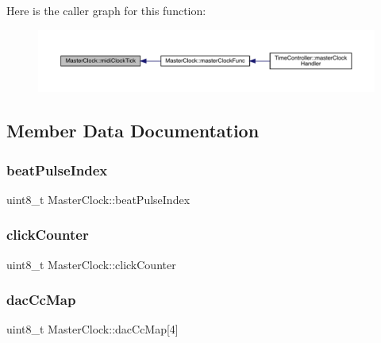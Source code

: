 Here is the caller graph for this function\+:
\nopagebreak
\begin{figure}[H]
\begin{center}
\leavevmode
\includegraphics[width=350pt]{class_master_clock_a9c19932a580f5c5797fd31a58dc1a410_icgraph}
\end{center}
\end{figure}


\subsection{Member Data Documentation}
\mbox{\label{class_master_clock_a0ad4b4c84d2c4edb8922b4ee35a82463}} 
\subsubsection{\texorpdfstring{beat\+Pulse\+Index}{beatPulseIndex}}
{\footnotesize\ttfamily uint8\+\_\+t Master\+Clock\+::beat\+Pulse\+Index}

\mbox{\label{class_master_clock_a38515df1824a4cadd6d8a277b5792dc3}} 
\subsubsection{\texorpdfstring{click\+Counter}{clickCounter}}
{\footnotesize\ttfamily uint8\+\_\+t Master\+Clock\+::click\+Counter}

\mbox{\label{class_master_clock_a8b3d56a964ecdfc61f7368184713dea0}} 
\subsubsection{\texorpdfstring{dac\+Cc\+Map}{dacCcMap}}
{\footnotesize\ttfamily uint8\+\_\+t Master\+Clock\+::dac\+Cc\+Map\mbox{[}4\mbox{]}}

